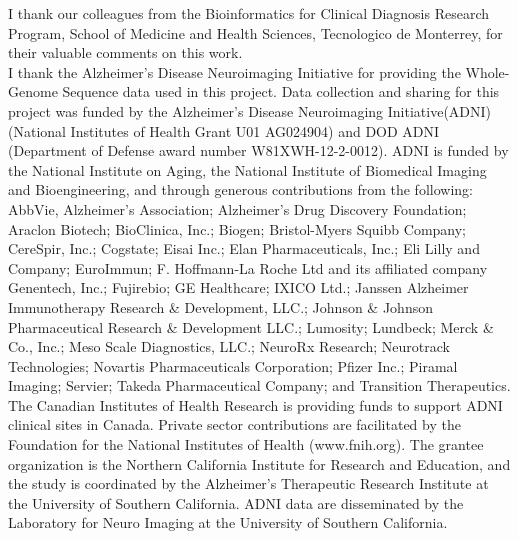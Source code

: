 I thank our colleagues from the Bioinformatics for Clinical Diagnosis Research Program, School of Medicine and Health Sciences, Tecnologico de Monterrey, for their valuable comments on this work. \\


I thank the Alzheimer's Disease Neuroimaging Initiative for providing the Whole-Genome Sequence data used in this project. Data collection and sharing for this project was funded by the Alzheimer's Disease Neuroimaging Initiative(ADNI) (National Institutes of Health Grant U01 AG024904) and DOD ADNI (Department of Defense award number W81XWH-12-2-0012). ADNI is funded by the National Institute on Aging, the National Institute of Biomedical Imaging and Bioengineering, and through generous contributions from the following: AbbVie, Alzheimer’s Association; Alzheimer’s Drug Discovery Foundation; Araclon Biotech; BioClinica, Inc.; Biogen; Bristol-Myers Squibb Company; CereSpir, Inc.; Cogstate; Eisai Inc.; Elan Pharmaceuticals, Inc.; Eli Lilly and
Company; EuroImmun; F. Hoffmann-La Roche Ltd and its affiliated company Genentech, Inc.; Fujirebio; GE Healthcare; IXICO Ltd.; Janssen Alzheimer Immunotherapy Research \& Development, LLC.; Johnson \& Johnson Pharmaceutical Research \& Development LLC.; Lumosity; Lundbeck; Merck \& Co., Inc.; Meso Scale Diagnostics, LLC.; NeuroRx Research; Neurotrack Technologies; Novartis Pharmaceuticals Corporation; Pfizer Inc.; Piramal Imaging; Servier; Takeda Pharmaceutical Company; and Transition Therapeutics. The Canadian Institutes of Health Research is providing funds to support ADNI clinical sites in Canada. Private sector contributions are facilitated by the Foundation for the National Institutes of Health (www.fnih.org). The grantee organization is the Northern California Institute for Research and Education, and the study is coordinated by the Alzheimer’s Therapeutic Research Institute at the University of Southern California. ADNI data are disseminated by the Laboratory for Neuro Imaging at the University of Southern California.\\

